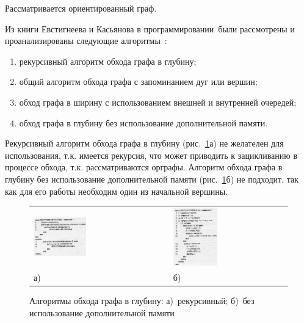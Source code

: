 \def\notedate{2023.01.10}
\def\currentauthor{Журавлев Н.В. (РК6-72Б)}

Рассматривается ориентированный граф.

Из книги Евстигнеева и Касьянова  в программировании\frqq\ были рассмотрены и проанализированы следующие алгоритмы~\cite{eg-graph}: 
\begin{enumerate}[label=\arabic*)]
  \item рекурсивный алгоритм обхода графа в глубину;
  \item общий алгоритм обхода графа с запоминанием дуг или вершин;
  \item обход графа в ширину с использованием внешней и внутренней очередей;
  \item обход графа в глубину без использование дополнительной памяти.
\end{enumerate}

Рекурсивный алгоритм обхода графа в глубину (рис.~\ref{fig:rec}а) не желателен для использования, т.к. имеется рекурсия, что может приводить к зацикливанию в процессе обхода, т.к. рассматриваются орграфы. Алгоритм обхода графа в глубину без использование дополнительной памяти (рис.~\ref{fig:rec}б) не подходит, так как для его работы необходим один \frqq{} из начальной вершины.

\begin{figure}[ht!]
    \centering
\begin{tabular}{P{0.5\textwidth}P{0.5\textwidth}}
  \includegraphics[width=0.4\textwidth]{ResearchNotes/rndhpc_int_edt_2023_01_10/rec.png} &
  \includegraphics[width=0.4\textwidth]{ResearchNotes/rndhpc_int_edt_2023_01_10/without_memory.png} \\
    а) & б) \\
\end{tabular}
    \caption{Алгоритмы обхода графа в глубину: а)~рекурсивный; б)~без использование дополнительной памяти}\label{fig:rec}
\end{figure}

